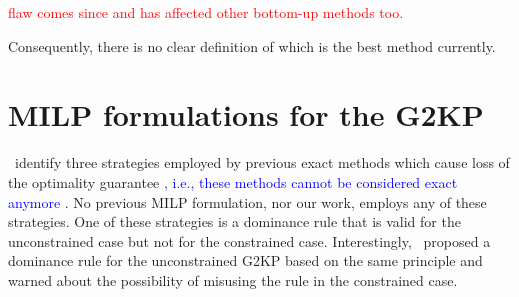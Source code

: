 \documentclass[ppgc,tese,english,formais,babel]{iiufrgs}
\newif\iffinalversion
\newcommand{\newtext}[1]{\iffinalversion%
#1%
\else%
\textcolor{blue}{#1}%
\fi%
}
\newcommand{\oldtext}[1]{\iffinalversion%
\else%
\textcolor{red}{#1}%
\fi%
}
\begin{document}
{%
}
\oldtext{\citet{yoon:2013} flaw comes since \citet{cung:2000} and has affected other bottom-up methods too.}

Consequently, there is no clear definition of which is the best method currently.

\section{MILP formulations for the G2KP}

\citet{russo:2020}~identify three strategies employed by previous exact methods which cause loss of the optimality guarantee\newtext{, i.e., these methods cannot be considered exact anymore}.
No previous MILP formulation, nor our work, employs any of these strategies.
One of these strategies is a dominance rule that is valid for the unconstrained case but not for the constrained case.
Interestingly, \citet{herz:1972}~proposed a dominance rule for the unconstrained G2KP based on the same principle and warned about the possibility of misusing the rule in the constrained case.
\end{document}
